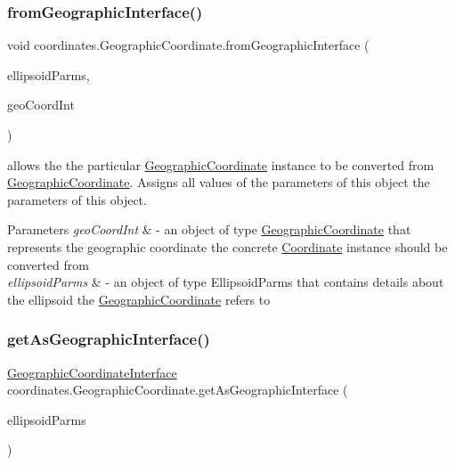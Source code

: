 \subsubsection{\texorpdfstring{from\+Geographic\+Interface()}{fromGeographicInterface()}}
{\footnotesize\ttfamily void coordinates.\+Geographic\+Coordinate.\+from\+Geographic\+Interface (\begin{DoxyParamCaption}\item[{\hyperlink{classparams_1_1_ellipsoid_parms}{Ellipsoid\+Parms}}]{ellipsoid\+Parms,  }\item[{\hyperlink{classcoordinates_1_1_geographic_coordinate_interface}{Geographic\+Coordinate\+Interface}}]{geo\+Coord\+Int }\end{DoxyParamCaption})}



allows the the particular \hyperlink{classcoordinates_1_1_geographic_coordinate}{Geographic\+Coordinate} instance to be converted from \hyperlink{classcoordinates_1_1_geographic_coordinate}{Geographic\+Coordinate}. Assigns all values of the parameters of this object the parameters of this object. 


\begin{DoxyParams}{Parameters}
{\em geo\+Coord\+Int} & -\/ an object of type \hyperlink{classcoordinates_1_1_geographic_coordinate}{Geographic\+Coordinate} that represents the geographic coordinate the concrete \hyperlink{classcoordinates_1_1_coordinate}{Coordinate} instance should be converted from \\
\hline
{\em ellipsoid\+Parms} & -\/ an object of type Ellipsoid\+Parms that contains details about the ellipsoid the \hyperlink{classcoordinates_1_1_geographic_coordinate}{Geographic\+Coordinate} refers to \\
\hline
\end{DoxyParams}
\mbox{\label{classcoordinates_1_1_geographic_coordinate_ae316c889f13670bd69d621858495e2f3}} 
\subsubsection{\texorpdfstring{get\+As\+Geographic\+Interface()}{getAsGeographicInterface()}}
{\footnotesize\ttfamily \hyperlink{classcoordinates_1_1_geographic_coordinate_interface}{Geographic\+Coordinate\+Interface} coordinates.\+Geographic\+Coordinate.\+get\+As\+Geographic\+Interface (\begin{DoxyParamCaption}\item[{\hyperlink{classparams_1_1_ellipsoid_parms}{Ellipsoid\+Parms}}]{ellipsoid\+Parms }\end{DoxyParamCaption})}



